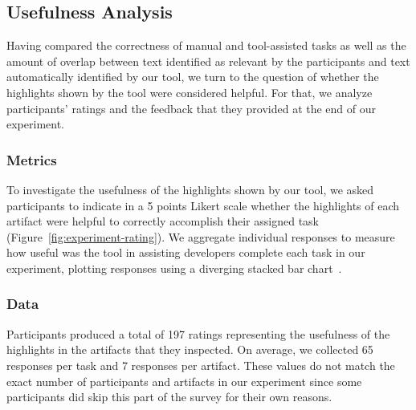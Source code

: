 

\subsection{Usefulness Analysis}
\label{cp6:usefulness}


Having compared the correctness of manual and tool-assisted tasks as well 
as the amount of overlap between text identified as relevant by the participants and 
text automatically identified by our tool, we turn to the question of 
whether the highlights shown by the tool were considered helpful. 
For that, we analyze participants' ratings and the feedback that they 
provided at the end of our experiment.








\subsubsection{Metrics}

To investigate the usefulness of the highlights shown by our tool, we asked participants to indicate in a 5 points Likert scale whether the highlights
of each artifact were helpful to correctly accomplish their assigned task (Figure~\ref{fig:experiment-rating}). We aggregate individual responses to measure how useful was 
the tool in assisting developers complete each task in our experiment, plotting responses using a diverging stacked bar chart~\cite{spence2001info-viz}.



\subsubsection{Data}


Participants produced a total of 197 ratings representing the usefulness of the highlights in the artifacts that they inspected.
On average, we collected 65 responses per task and 7 responses per artifact.  
These values do not match the exact number of participants and artifacts in our experiment since some participants did skip this part of 
the survey for their own reasons.


